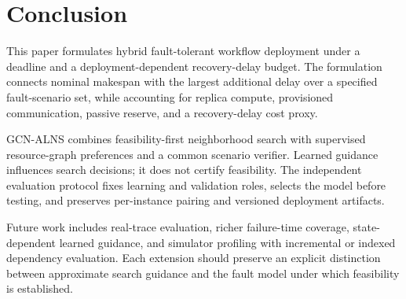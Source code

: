 \section{Conclusion}
\label{sec:conclusion}
This paper formulates hybrid fault-tolerant workflow deployment under a
deadline and a deployment-dependent recovery-delay budget. The formulation
connects nominal makespan with the largest additional delay over a specified
fault-scenario set, while accounting for replica compute, provisioned
communication, passive reserve, and a recovery-delay cost proxy.

GCN-ALNS combines feasibility-first neighborhood search with supervised
resource-graph preferences and a common scenario verifier. Learned guidance
influences search decisions; it does not certify feasibility. The independent
evaluation protocol fixes learning and validation roles, selects the model
before testing, and preserves per-instance pairing and versioned deployment
artifacts.


Future work includes real-trace evaluation, richer failure-time coverage,
state-dependent learned guidance, and simulator profiling with incremental
or indexed dependency evaluation. Each extension should preserve an explicit
distinction between approximate search guidance and the fault model under
which feasibility is established.
